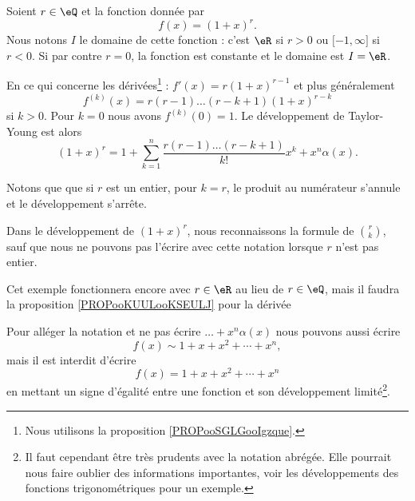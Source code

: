 \begin{example}     \label{EXooFLBJooYfuRsG}
	Soient \( r\in \eQ\) et la fonction donnée par
	\begin{equation}
		f(x)=(1+x)^r.
	\end{equation}
	Nous notons \( I\) le domaine de cette fonction : c'est \( \eR\) si \( r>0\) ou \( \mathopen[ -1 , \infty \mathclose]\) si \( r<0\). Si par contre \( r=0\), la fonction est constante et le domaine est \( I=\eR\).

	En ce qui concerne les dérivées\footnote{Nous utilisons la proposition \ref{PROPooSGLGooIgzque}.} : \( f'(x)=r(1+x)^{r-1}\) et plus généralement
	\begin{equation}
		f^{(k)}(x)=r(r-1)\ldots (r-k+1)(1+x)^{r-k}
	\end{equation}
	si \( k>0\). Pour \( k=0\) nous avons \( f^{(k)}(0)=1\). Le développement de Taylor-Young est alors
	\begin{equation}
		(1+x)^r=1+\sum_{k=1}^n\frac{r(r-1)\ldots (r-k+1)}{ k! }x^k+x^n\alpha(x).
	\end{equation}

	Notons que que si \( r\) est un entier, pour \( k=r\), le produit au numérateur s'annule et le développement s'arrête.

	Dans le développement de \( (1+x)^{r}\), nous reconnaissons la formule de \( \binom{ r }{k}\), sauf que nous ne pouvons pas l'écrire avec cette notation lorsque \( r\) n'est pas entier.
\end{example}
Cet exemple fonctionnera encore avec \( r\in \eR\) au lieu de \( r\in \eQ\), mais il faudra la proposition \ref{PROPooKUULooKSEULJ} pour la dérivée

\begin{remark}
	Pour alléger la notation et ne pas écrire \(\ldots +x^n\alpha(x)\) nous pouvons aussi écrire
	\begin{equation}
		f(x)\sim 1+x+x^2+\cdots +x^n,
	\end{equation}
	mais il est interdit d'écrire
	\begin{equation}
		f(x)= 1+x+x^2+\cdots +x^n
	\end{equation}
	en mettant un signe d'égalité entre une fonction et son développement limité\footnote{Il faut cependant être très prudents avec la notation abrégée. Elle pourrait nous faire oublier des informations importantes, voir les développements des fonctions trigonométriques pour un exemple.}.
\end{remark}

